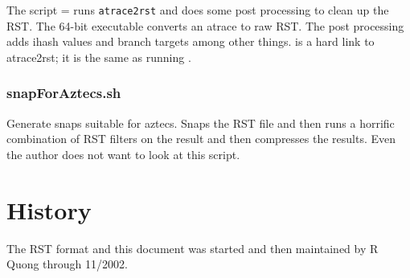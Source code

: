\documentclass[10pt]{article}
\begin{document}
The script  = runs \texttt{atrace2rst} and does some
post processing to clean up the RST.  The 64-bit executable
 converts an atrace to raw RST.  The post processing
adds ihash values and branch targets among other things.
 is a hard link to atrace2rst; it is the same as running
.

\subsubsection{snapForAztecs.sh}

Generate snaps suitable for aztecs.  Snaps the RST file and then runs a
horrific combination of RST filters on the result and then compresses
the results.  Even the author does not want to look at this script.

\section{History}

The RST format and this document was started and then maintained by R
Quong through 11/2002.
\end{document}
